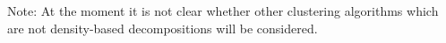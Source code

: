 Note: At the moment it is not clear whether other clustering algorithms which are not density-based decompositions will be considered. 